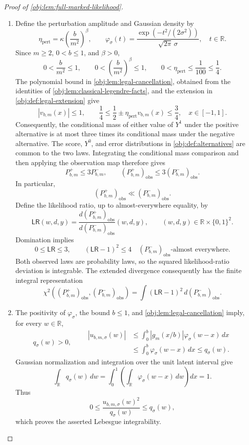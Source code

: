 \documentclass[11pt]{article}
\begin{document}
\begin{proof}[Proof of \cref{obj:lem:full-marked-likelihood}]
\begin{enumerate}
\item Define the perturbation amplitude and Gaussian density by
\[
\eta_{\mathrm{pert}}
=\kappa\left(\frac{b}{m^2}\right)^\beta,
\qquad
\varphi_\sigma(t)
=\frac{\exp(-t^2/(2\sigma^2))}{\sqrt{2\pi}\,\sigma},
\quad t\in\mathbb R.
\]
Since \(m\ge2\), \(0<b\le1\), and \(\beta>0\),
\[
0<\frac{b}{m^2}\le1,
\qquad
0<\left(\frac{b}{m^2}\right)^\beta\le1,
\qquad
0<\eta_{\mathrm{pert}}\le\frac1{100}\le\frac14.
\]
The polynomial bound in \cref{obj:lem:legal-cancellation}, obtained from the identities of \cref{obj:lem:classical-legendre-facts}, and the extension in \cref{obj:def:legal-extension} give
\[
|v_{b,m}(x)|\le1,
\qquad
\frac14\le\frac12\pm\eta_{\mathrm{pert}}v_{b,m}(x)\le\frac34,
\quad x\in[-1,1].
\]
Consequently, the conditional mass of either value of \(Y^1\) under the positive alternative is at most three times its conditional mass under the negative alternative. The score, \(Y^0\), and error distributions in \cref{obj:def:alternatives} are common to the two laws. Integrating the conditional mass comparison and then applying the observation map therefore gives
\[
P^+_{b,m}\le3P^-_{b,m},
\qquad
(P^+_{b,m})_{\mathrm{obs}}
\le3(P^-_{b,m})_{\mathrm{obs}}.
\]
In particular,
\[
(P^+_{b,m})_{\mathrm{obs}}
\ll(P^-_{b,m})_{\mathrm{obs}}.
\]
Define the likelihood ratio, up to almost-everywhere equality, by
\[
\mathsf{LR}(w,d,y)
=
\frac{d(P^+_{b,m})_{\mathrm{obs}}}
     {d(P^-_{b,m})_{\mathrm{obs}}}(w,d,y),
\qquad
(w,d,y)\in\mathbb R\times\{0,1\}^2.
\]
Domination implies
\[
0\le\mathsf{LR}\le3,
\qquad
(\mathsf{LR}-1)^2\le4
\quad
(P^-_{b,m})_{\mathrm{obs}}\text{-almost everywhere}.
\]
Both observed laws are probability laws, so the squared likelihood-ratio deviation is integrable. The extended divergence consequently has the finite integral representation
\[
\chi^2\!\left((P^+_{b,m})_{\mathrm{obs}},
             (P^-_{b,m})_{\mathrm{obs}}\right)
=
\int(\mathsf{LR}-1)^2\,d(P^-_{b,m})_{\mathrm{obs}}.
\]

\item The positivity of \(\varphi_\sigma\), the bound \(b\le1\), and \cref{obj:lem:legal-cancellation} imply, for every \(w\in\mathbb R\),
\[
q_\sigma(w)>0,
\qquad
\begin{aligned}
|u_{b,m,\sigma}(w)|
&\le\int_0^b |g_m(x/b)|\varphi_\sigma(w-x)\,dx\\
&\le\int_0^b\varphi_\sigma(w-x)\,dx
\le q_\sigma(w).
\end{aligned}
\]
Gaussian normalization and integration over the unit latent interval give
\[
\int_{\mathbb R}q_\sigma(w)\,dw
=
\int_0^1\left(\int_{\mathbb R}\varphi_\sigma(w-x)\,dw\right)dx
=1.
\]
Thus
\[
0\le
\frac{u_{b,m,\sigma}(w)^2}{q_\sigma(w)}
\le q_\sigma(w),
\]
which proves the asserted Lebesgue integrability.


\end{enumerate}
\end{proof}
\end{document}
